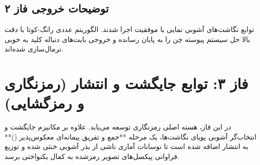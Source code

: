 \subsection*{توضیحات خروجی فاز ۲}
توابع نگاشت‌های آشوبی نمایی با موفقیت اجرا شدند. الگوریتم عددی رانگ-کوتا با دقت بالا حل سیستم پیوسته چن را به پایان رسانده و خروجی بایت‌های دنباله کلید به خوبی نرمال‌سازی شده‌اند.

\section{فاز ۳: توابع جایگشت و انتشار (رمزنگاری و رمزگشایی)}
در این فاز، هسته اصلی رمزنگاری توسعه می‌یابد. علاوه بر مکانیزم جایگشت و انتخاب‌گر آشوبی پویای نگاشت‌ها، یک مرحله **جمع و تفریق پیمانه‌ای معکوس‌پذیر ()** به انتشار اضافه شده است تا نوسانات آماری ناشی از بذر آشوبی خنثی شده و توزیع فراوانی پیکسل‌های تصویر رمزشده به کمال یکنواختی برسد.

